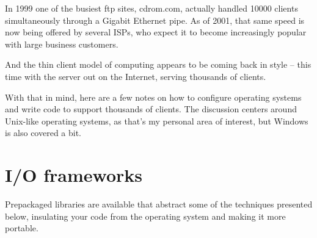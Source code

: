 \documentclass[twoside, xetex]{report}
\begin{document}
In 1999 one of the busiest ftp sites, cdrom.com, actually handled 10000 clients simultaneously through a Gigabit Ethernet pipe. As of 2001, that same speed is now being offered by several ISPs, who expect it to become increasingly popular with large business customers.

And the thin client model of computing appears to be coming back in style -- this time with the server out on the Internet, serving thousands of clients.

With that in mind, here are a few notes on how to configure operating systems and write code to support thousands of clients. The discussion centers around Unix-like operating systems, as that's my personal area of interest, but Windows is also covered a bit.

\section*{I/O frameworks}

Prepackaged libraries are available that abstract some of the techniques presented below, insulating your code from the operating system and making it more portable.
	
\end{document}
